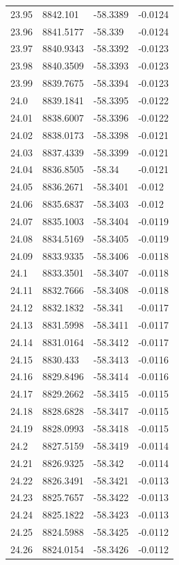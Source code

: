 \begin{table}[H]
\begin{tabular}{llll}
23.95 & 8842.101 & -58.3389 & -0.0124 \\
23.96 & 8841.5177 & -58.339 & -0.0124 \\
23.97 & 8840.9343 & -58.3392 & -0.0123 \\
23.98 & 8840.3509 & -58.3393 & -0.0123 \\
23.99 & 8839.7675 & -58.3394 & -0.0123 \\
24.0 & 8839.1841 & -58.3395 & -0.0122 \\
24.01 & 8838.6007 & -58.3396 & -0.0122 \\
24.02 & 8838.0173 & -58.3398 & -0.0121 \\
24.03 & 8837.4339 & -58.3399 & -0.0121 \\
24.04 & 8836.8505 & -58.34 & -0.0121 \\
24.05 & 8836.2671 & -58.3401 & -0.012 \\
24.06 & 8835.6837 & -58.3403 & -0.012 \\
24.07 & 8835.1003 & -58.3404 & -0.0119 \\
24.08 & 8834.5169 & -58.3405 & -0.0119 \\
24.09 & 8833.9335 & -58.3406 & -0.0118 \\
24.1 & 8833.3501 & -58.3407 & -0.0118 \\
24.11 & 8832.7666 & -58.3408 & -0.0118 \\
24.12 & 8832.1832 & -58.341 & -0.0117 \\
24.13 & 8831.5998 & -58.3411 & -0.0117 \\
24.14 & 8831.0164 & -58.3412 & -0.0117 \\
24.15 & 8830.433 & -58.3413 & -0.0116 \\
24.16 & 8829.8496 & -58.3414 & -0.0116 \\
24.17 & 8829.2662 & -58.3415 & -0.0115 \\
24.18 & 8828.6828 & -58.3417 & -0.0115 \\
24.19 & 8828.0993 & -58.3418 & -0.0115 \\
24.2 & 8827.5159 & -58.3419 & -0.0114 \\
24.21 & 8826.9325 & -58.342 & -0.0114 \\
24.22 & 8826.3491 & -58.3421 & -0.0113 \\
24.23 & 8825.7657 & -58.3422 & -0.0113 \\
24.24 & 8825.1822 & -58.3423 & -0.0113 \\
24.25 & 8824.5988 & -58.3425 & -0.0112 \\
24.26 & 8824.0154 & -58.3426 & -0.0112 \\

\end{tabular}
\end{table}
